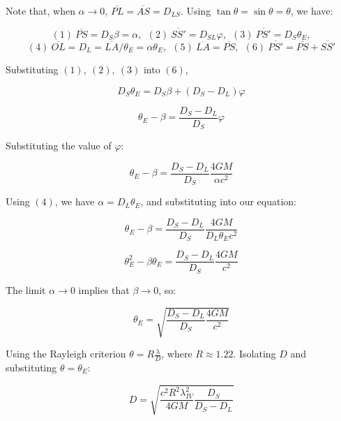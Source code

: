 \documentclass[11pt]{article}
\begin{document}
\begin{pproblem}
    \begin{pssolution*}{}{}
        \begin{alternativas}
            \item Note that, when \(\alpha \rightarrow 0\), \(\overline{PL}=\overline{AS}=D_{LS}\). Using \(\tan\theta = \sin\theta=\theta\), we have:
            
            \[(1)\ \overline{PS} = D_S\beta = \alpha, \ \ (2)\ \overline{SS'} = D_{SL}\varphi, \ \ (3)\ \overline{PS'} = D_S\theta_E,\] 
            \[(4)\ \overline{OL} = D_L = \overline{LA}/\theta_E = \alpha\theta_E, \ \ (5)\ \overline{LA}=\overline{PS}, \ \ (6)\ \overline{PS'} = \overline{PS}+\overline{SS'}\]

            Substituting \((1), \ (2), \ (3)\) into \((6)\), 

            \[D_S\theta_E=D_S\beta+(D_S-D_L)\varphi\]

            \[\theta_E-\beta = \frac{D_S-D_L}{D_S}\varphi\]

            Substituting the value of \(\varphi\):

            \[\theta_E-\beta = \frac{D_S-D_L}{D_S}\frac{4GM}{\alpha c^2}\]

            Using \((4)\), we have \(\alpha=D_L\theta_E\), and substituting into our equation:

            \[\theta_E-\beta = \frac{D_S-D_L}{D_S}\frac{4GM}{D_L\theta_E c^2}\]

            \[\theta_E^2-\beta\theta_E = \frac{D_S-D_L}{D_S}\frac{4GM}{c^2}\]

            The limit \(\alpha\rightarrow 0\) implies that \(\beta\rightarrow 0\), so:

            \[\boxed{\theta_E=\sqrt{\frac{D_S-D_L}{D_S}\frac{4GM}{c^2}}}\]

            \item Using the Rayleigh criterion \(\theta = R\frac{\lambda}{D}\), where \(R\approx 1.22\). Isolating \(D\) and substituting \(\theta = \theta_E\):
            
            \[\boxed{D =\sqrt{\frac{c^2R^2\lambda_{IV}^2}{4GM}\frac{D_S}{D_S-D_L}}}\]
        \end{alternativas}
    \end{pssolution*}
\end{pproblem}
\end{document}
